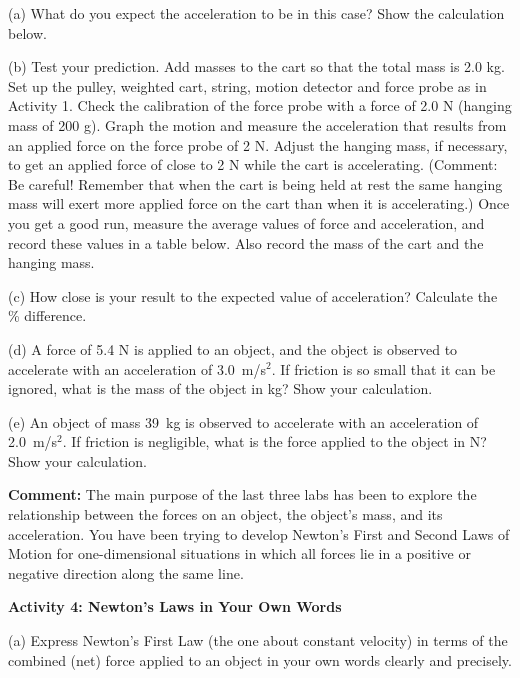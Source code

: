 (a) What do you expect the acceleration to be in this case? Show the calculation
below.
\vspace{20mm}

(b) Test your prediction. Add masses to the cart so that the total mass is 2.0
kg. Set up the pulley, weighted cart, string, motion detector and force probe
as in Activity 1. Check the calibration of the force probe with a force of 2.0
N (hanging mass of 200 g). Graph the motion and measure the acceleration that
results from an applied force on the force probe of 2 N. Adjust the hanging
mass, if necessary, to get an applied force of close to 2 N while the cart is
accelerating. (Comment: Be careful! Remember that when the cart is being held
at rest the same hanging mass will exert more applied force on the cart than
when it is accelerating.) Once you get a good run, measure the average values
of force and acceleration, and record these values in a table below. Also record
the mass of the cart and the hanging mass.
\vspace{30mm}

(c) How close is your result to the expected value of acceleration? Calculate
the \% difference.
\vspace{20mm}

(d) A force of 5.4 N is applied to an object, and the object is observed to
accelerate with an acceleration of 3.0~m/s$^2$. If friction is so small that it
can be ignored, what is the mass of the object in kg? Show your calculation.
\vspace{20mm}

(e) An object of mass 39~kg is observed to accelerate with an acceleration of
2.0~m/s$^2$. If friction is negligible, what is the force applied to the object
in N? Show your calculation.
\vspace{20mm}

\textbf{Comment:} The main purpose of the last three labs has been to explore
the relationship between the forces on an object, the object's mass, and its
acceleration. You have been trying to develop Newton's First and Second Laws
of Motion for one-dimensional situations in which all forces lie in a positive
or negative direction along the same line. 

\pagebreak[2]
\textbf{Activity 4: Newton's Laws in Your Own Words} 

(a) Express Newton's First Law (the one about constant velocity) in terms of
the combined (net) force applied to an object in your own words clearly and
precisely.
\vspace{20mm}

